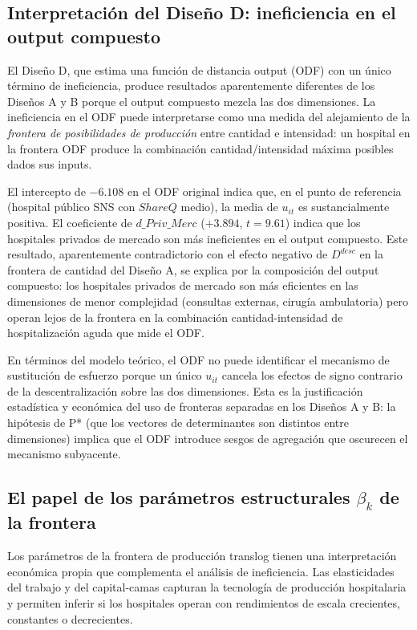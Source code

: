 \documentclass[12pt, a4paper, twoside, openright]{book}
\theoremstyle{plain}
\theoremstyle{definition}
\theoremstyle{remark}
\begin{document}
\subsection{Interpretación del Diseño D: ineficiencia en el output compuesto}

El Diseño D, que estima una función de distancia output (ODF) con un único término de ineficiencia, produce resultados aparentemente diferentes de los Diseños A y B porque el output compuesto mezcla las dos dimensiones. La ineficiencia en el ODF puede interpretarse como una medida del alejamiento de la \textit{frontera de posibilidades de producción} entre cantidad e intensidad: un hospital en la frontera ODF produce la combinación cantidad/intensidad máxima posibles dados sus inputs.

El intercepto de $-6.108$ en el ODF original indica que, en el punto de referencia (hospital público SNS con $ShareQ$ medio), la media de $u_{it}$ es sustancialmente positiva. El coeficiente de $d\_Priv\_Merc$ ($+3.894$, $t=9.61$) indica que los hospitales privados de mercado son más ineficientes en el output compuesto. Este resultado, aparentemente contradictorio con el efecto negativo de $D^{desc}$ en la frontera de cantidad del Diseño A, se explica por la composición del output compuesto: los hospitales privados de mercado son más eficientes en las dimensiones de menor complejidad (consultas externas, cirugía ambulatoria) pero operan lejos de la frontera en la combinación cantidad-intensidad de hospitalización aguda que mide el ODF.

En términos del modelo teórico, el ODF no puede identificar el mecanismo de sustitución de esfuerzo porque un único $u_{it}$ cancela los efectos de signo contrario de la descentralización sobre las dos dimensiones. Esta es la justificación estadística y económica del uso de fronteras separadas en los Diseños A y B: la hipótesis de P* (que los vectores de determinantes son distintos entre dimensiones) implica que el ODF introduce sesgos de agregación que oscurecen el mecanismo subyacente.

\subsection{El papel de los parámetros estructurales \texorpdfstring{$\beta_k$}{beta\_k} de la frontera}

Los parámetros de la frontera de producción translog tienen una interpretación económica propia que complementa el análisis de ineficiencia. Las elasticidades del trabajo y del capital-camas capturan la tecnología de producción hospitalaria y permiten inferir si los hospitales operan con rendimientos de escala crecientes, constantes o decrecientes.
\end{document}
